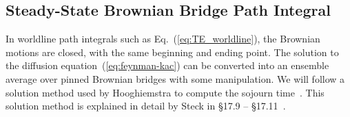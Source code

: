 \subsection{Steady-State Brownian Bridge Path Integral}

In worldline path integrals such as Eq.~(\ref{eq:TE_worldline}), 
the Brownian motions are closed, with the same beginning and ending point.  
The solution to the diffusion equation~(\ref{eq:feynman-kac}) can be converted into an 
ensemble average over pinned Brownian bridges  with some manipulation.
We will follow a solution method used by Hooghiemstra to compute the sojourn time~\cite{
Hooghiemstra2002}.  
This solution method is explained in detail by Steck in \S 17.9 -- \S 17.11~\cite{SteckNotes}.

